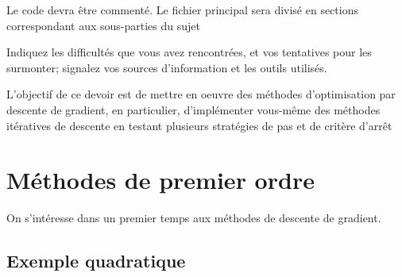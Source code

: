 \documentclass{article}
\begin{document}
\noindent Le code devra être commenté. Le fichier principal sera divisé en sections correspondant aux sous-parties du sujet

\noindent Indiquez les difficultés que vous avez rencontrées, et vos tentatives pour les surmonter; signalez vos sources d'information et les outils utilisés.

\newpage


L'objectif de ce devoir est de mettre en oeuvre des méthodes d'optimisation par descente de gradient, en particulier, d'implémenter vous-même des méthodes itératives de descente en testant plusieurs stratégies de pas et de critère d'arrêt

\section{Méthodes de premier ordre}

On s'intéresse dans un premier temps aux méthodes de descente de gradient.

\subsection{Exemple quadratique}
\end{document}
